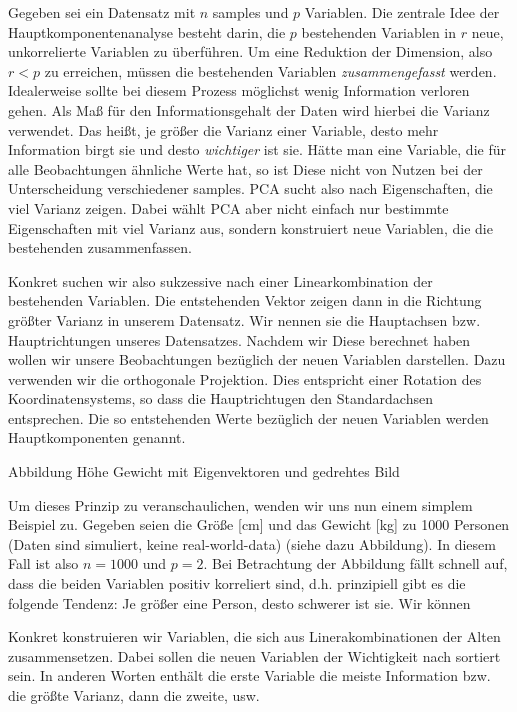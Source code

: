 Gegeben sei ein Datensatz mit $n$ samples und $p$ Variablen. Die zentrale Idee der Hauptkomponentenanalyse besteht darin, die $p$ bestehenden Variablen in $r$ neue, unkorrelierte Variablen zu überführen. Um eine Reduktion der Dimension, also $r < p$ zu erreichen, müssen die bestehenden Variablen \textit{zusammengefasst} werden. Idealerweise sollte bei diesem Prozess möglichst wenig Information verloren gehen. Als Maß für den Informationsgehalt der Daten wird hierbei die Varianz verwendet. Das heißt, je größer die Varianz einer Variable, desto mehr Information birgt sie und desto \textit{wichtiger} ist sie. Hätte man eine Variable, die für alle Beobachtungen ähnliche Werte hat, so ist Diese nicht von Nutzen bei der Unterscheidung verschiedener samples. PCA sucht also nach Eigenschaften, die viel Varianz zeigen. Dabei wählt PCA aber nicht einfach nur bestimmte Eigenschaften mit viel Varianz aus, sondern konstruiert neue Variablen, die die bestehenden zusammenfassen.

Konkret suchen wir also sukzessive nach einer Linearkombination der bestehenden Variablen. Die entstehenden Vektor zeigen dann in die Richtung größter Varianz in unserem Datensatz. Wir nennen sie die Hauptachsen bzw. Hauptrichtungen unseres Datensatzes. Nachdem wir Diese berechnet haben wollen wir unsere Beobachtungen bezüglich der neuen Variablen darstellen. Dazu verwenden wir die orthogonale Projektion. Dies entspricht einer Rotation des Koordinatensystems, so dass die Hauptrichtugen den Standardachsen entsprechen. Die so entstehenden Werte bezüglich der neuen Variablen werden Hauptkomponenten genannt. 

Abbildung Höhe Gewicht mit Eigenvektoren und gedrehtes Bild

Um dieses Prinzip zu veranschaulichen, wenden wir uns nun einem simplem Beispiel zu. Gegeben seien die Größe [cm] und das Gewicht [kg] zu 1000 Personen (Daten sind simuliert, keine real-world-data) (siehe dazu Abbildung). In diesem Fall ist also $n = 1000$ und $p = 2$. Bei Betrachtung der Abbildung fällt schnell auf, dass die beiden Variablen positiv korreliert sind, d.h. prinzipiell gibt es die folgende Tendenz: Je größer eine Person, desto schwerer ist sie. Wir können

Konkret konstruieren wir Variablen, die sich aus Linerakombinationen der Alten zusammensetzen. Dabei sollen die neuen Variablen der Wichtigkeit nach sortiert sein. In anderen Worten enthält die erste Variable die meiste Information bzw. die größte Varianz, dann die zweite, usw.

